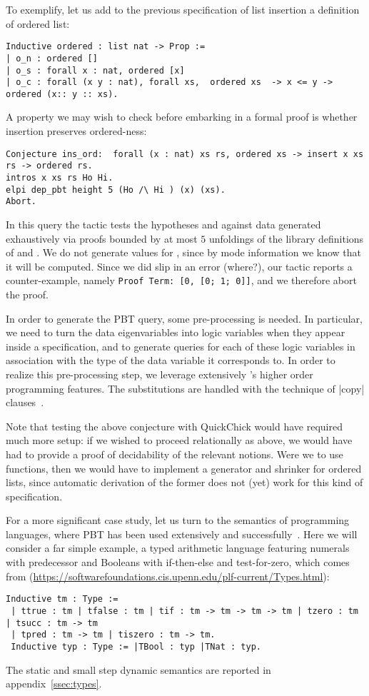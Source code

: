 To exemplify, let us add to the previous specification of list
insertion a definition of ordered list:
\begin{lstlisting}
Inductive ordered : list nat -> Prop :=
| o_n : ordered []
| o_s : forall x : nat, ordered [x]
| o_c : forall (x y : nat), forall xs,  ordered xs  -> x <= y -> ordered (x:: y :: xs).     
\end{lstlisting}
%
A property we may wish to check before embarking in a formal proof is
whether insertion preserves ordered-ness:
\begin{lstlisting}
Conjecture ins_ord:  forall (x : nat) xs rs, ordered xs -> insert x xs rs -> ordered rs.
intros x xs rs Ho Hi.
elpi dep_pbt height 5 (Ho /\ Hi ) (x) (xs).
Abort.
\end{lstlisting}
In this query the tactic tests the hypotheses  and 
against data  generated exhaustively via proofs bounded by
at most $5$ unfoldings of the library  definitions of
 and . We do not generate values for ,
since by mode information we know that it will be computed.
%
Since we did slip in an error (where?), our tactic reports a
counter-example, namely \verb|Proof Term: [0, [0; 1; 0]]|, and
we therefore abort the proof.


In order to generate the PBT query, some
pre-processing is needed. In particular, we need to turn the data
eigenvariables into \lP logic variables when they appear inside a
specification, and to generate queries %
for each of
these logic variables in association with the type of the data
variable it corresponds to.  In order to realize this pre-processing step,
we leverage extensively \lP's higher order programming features. The
substitutions are handled with the technique of \lsti|copy| clauses~\cite{miller91jlc}.

Note that testing the above conjecture with \textsf{QuickChick} would
have required much more setup: if we wished to proceed relationally as
above, we would have had to provide a proof of decidability of the
relevant notions. Were we to use functions, then we would have to
implement a generator and shrinker for ordered lists, since automatic
derivation of the former does not (yet) work for this kind of specification.


For a more significant case study, let us turn to the semantics of
programming languages, where PBT has been used extensively and
successfully~\cite{Klein12}. Here we will consider a far simple example,
a typed arithmetic language featuring numerals with predecessor
and Booleans with if-then-else and test-for-zero, which comes from
(\url{https://softwarefoundations.cis.upenn.edu/plf-current/Types.html}):
\begin{lstlisting}
Inductive tm : Type :=
 | ttrue : tm | tfalse : tm | tif : tm -> tm -> tm -> tm | tzero : tm | tsucc : tm -> tm
 | tpred : tm -> tm | tiszero : tm -> tm.
 Inductive typ : Type := |TBool : typ |TNat : typ.
\end{lstlisting}
The static and small step dynamic semantics are reported in appendix~\ref{ssec:types}.

